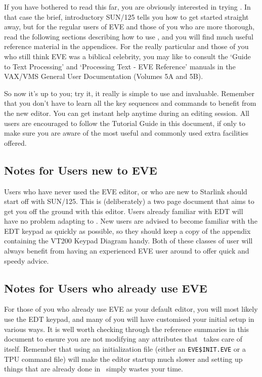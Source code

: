 If you have bothered to read this far, you are obviously interested in trying
\STEve. In that case the brief, introductory SUN/125 tells you how to get
started straight away, but for the regular users of EVE and those of you who
are more thorough, read the following sections describing how to use
\STEve, and you will find much useful reference material in the appendices.
For the really particular and those of you who still think EVE was a biblical
celebrity, you may like to consult the `Guide to Text Processing' and
`Processing Text - EVE Reference' manuals in the VAX/VMS General User
Documentation (Volumes 5A and 5B).

So now it's up to you; try it, it really is simple to use and invaluable.
Remember that you don't have to learn all the key sequences and commands to
benefit from the new editor. You can get instant help anytime during an editing
session. All users are encouraged to follow the Tutorial Guide in this
document, if only to make sure you are aware of the most useful and commonly
used extra facilities offered.

\subsection{Notes for Users new to EVE}

Users who have never used the EVE editor, or who are new to Starlink should
start off with SUN/125. This is (deliberately) a two page document that aims to
get you off the ground with this editor. Users already familiar with EDT will
have no problem adapting to \STEve. New users are advised to become familiar
with the EDT keypad as quickly as possible, so they should keep a copy of the
appendix containing the VT200 Keypad Diagram handy. Both of these classes of
user will always benefit from having an experienced EVE user around to offer
quick and speedy advice.

\subsection{Notes for Users who already use EVE}

For those of you who already use EVE as your default editor, you will most
likely use the EDT keypad, and many of you will have customised your initial
setup in various ways. It is well worth checking through the reference
summaries in this document to ensure you are not modifying any attributes that
\STEve\ takes care of itself. Remember that using an initialization file
(either an {\tt EVE\$INIT.EVE} or a TPU command file) will make the editor
startup much slower and setting up things that are already done in \STEve\
simply wastes your time.

